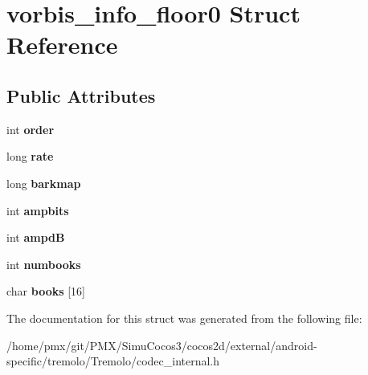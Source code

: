 \hypertarget{structvorbis__info__floor0}{}\section{vorbis\+\_\+info\+\_\+floor0 Struct Reference}
\label{structvorbis__info__floor0}
\subsection*{Public Attributes}
\begin{DoxyCompactItemize}
\item 
\mbox{\label{structvorbis__info__floor0_a84d5b9c9a1c85caeb2cdd57992d8489d}} 
int {\bfseries order}
\item 
\mbox{\label{structvorbis__info__floor0_aec574189f1a7b44076c006e60f033160}} 
long {\bfseries rate}
\item 
\mbox{\label{structvorbis__info__floor0_aa0ee524de27bf41fadb08d075ac65265}} 
long {\bfseries barkmap}
\item 
\mbox{\label{structvorbis__info__floor0_a01f2bbcabd4a1d82a3466598ded6ab67}} 
int {\bfseries ampbits}
\item 
\mbox{\label{structvorbis__info__floor0_a1896fee756462b4168a7c89b0514ef2e}} 
int {\bfseries ampdB}
\item 
\mbox{\label{structvorbis__info__floor0_ae0b77b1ba0cc2cb5f3b5731758817540}} 
int {\bfseries numbooks}
\item 
\mbox{\label{structvorbis__info__floor0_ab71df4431a2db910927dd14551aed235}} 
char {\bfseries books} \mbox{[}16\mbox{]}
\end{DoxyCompactItemize}


The documentation for this struct was generated from the following file\+:\begin{DoxyCompactItemize}
\item 
/home/pmx/git/\+P\+M\+X/\+Simu\+Cocos3/cocos2d/external/android-\/specific/tremolo/\+Tremolo/codec\+\_\+internal.\+h\end{DoxyCompactItemize}
